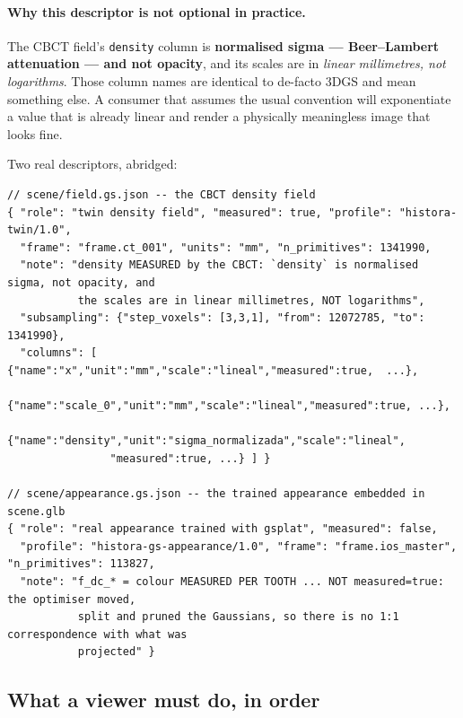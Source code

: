 \documentclass[11pt,a4paper]{article}
\newcommand{\code}[1]{\texttt{\small #1}}
\begin{document}
\paragraph{Why this descriptor is not optional in practice.}
The CBCT field's \code{density} column is \textbf{normalised sigma --- Beer--Lambert
attenuation --- and not opacity}, and its scales are in \emph{linear millimetres, not
logarithms}. Those column names are identical to de-facto 3DGS and mean something else. A
consumer that assumes the usual convention will exponentiate a value that is already
linear and render a physically meaningless image that looks fine.

\newpage
Two real descriptors, abridged:

\begin{lstlisting}[style=js]
// scene/field.gs.json -- the CBCT density field
{ "role": "twin density field", "measured": true, "profile": "histora-twin/1.0",
  "frame": "frame.ct_001", "units": "mm", "n_primitives": 1341990,
  "note": "density MEASURED by the CBCT: `density` is normalised sigma, not opacity, and
           the scales are in linear millimetres, NOT logarithms",
  "subsampling": {"step_voxels": [3,3,1], "from": 12072785, "to": 1341990},
  "columns": [ {"name":"x","unit":"mm","scale":"lineal","measured":true,  ...},
               {"name":"scale_0","unit":"mm","scale":"lineal","measured":true, ...},
               {"name":"density","unit":"sigma_normalizada","scale":"lineal",
                "measured":true, ...} ] }

// scene/appearance.gs.json -- the trained appearance embedded in scene.glb
{ "role": "real appearance trained with gsplat", "measured": false,
  "profile": "histora-gs-appearance/1.0", "frame": "frame.ios_master", "n_primitives": 113827,
  "note": "f_dc_* = colour MEASURED PER TOOTH ... NOT measured=true: the optimiser moved,
           split and pruned the Gaussians, so there is no 1:1 correspondence with what was
           projected" }
\end{lstlisting}

\subsection{What a viewer must do, in order}\label{sec:vieweralgo}
\end{document}

